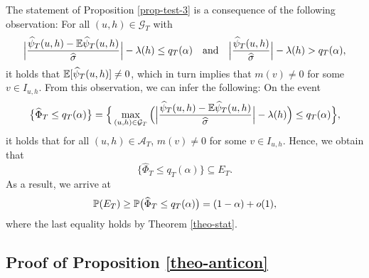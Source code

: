 \documentclass[a4paper,12pt]{article}
\numberwithin{equation}{section}
\begin{document}
 
The statement of Proposition \ref{prop-test-3} is a consequence of the following observation: For all $(u,h) \in \mathcal{G}_T$ with 
\[ \Big|\frac{\widehat{\psi}_T(u,h) - \mathbb{E} \widehat{\psi}_T(u,h)}{\widehat{\sigma}}\Big| - \lambda(h) \le q_T(\alpha) \quad \text{and} \quad \Big|\frac{\widehat{\psi}_T(u,h)}{\widehat{\sigma}}\Big| - \lambda(h) > q_T(\alpha), \]
it holds that $\mathbb{E}[\widehat{\psi}_T(u,h)] \ne 0$, which in turn implies that $m(v) \ne 0$ for some $v \in I_{u,h}$. From this observation, we can infer the following: On the event 
\[ \big\{ \widehat{\Phi}_T \le q_T(\alpha) \big\} = \Big\{ \max_{(u,h) \in \mathcal{G}_T} \Big( \Big|\frac{\widehat{\psi}_T(u,h) - \mathbb{E} \widehat{\psi}_T(u,h)}{\widehat{\sigma}}\Big| - \lambda(h) \Big) \le q_T(\alpha) \Big\}, \]
it holds that for all $(u,h) \in \mathcal{A}_T$, 
$m(v) \ne 0$ for some $v \in I_{u,h}$. Hence, we obtain that 
\[ \big\{ \widehat{\Phi}_T \le q_T(\alpha) \big\} \subseteq E_T. \]
As a result, we arrive at  
\[ \mathbb{P}(E_T) \ge \mathbb{P} \big(  \widehat{\Phi}_T \le q_T(\alpha) \big) = (1-\alpha) + o(1), \]
where the last equality holds by Theorem \ref{theo-stat}.



\subsection*{Proof of Proposition \ref{theo-anticon}}
\end{document}

